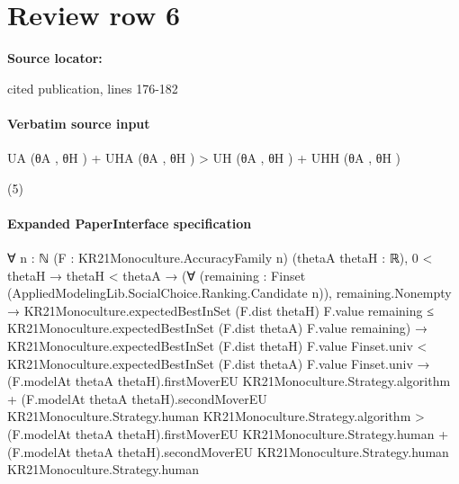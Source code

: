 \documentclass[10pt]{article}
\begin{document}
\section*{Review row 6}
\textbf{Source locator:} {\footnotesize\raggedright cited publication, lines 176-\allowbreak{}182\par}
\paragraph{Verbatim source input}
\begin{ReviewVerbatim}
UA (θA , θH ) + UHA (θA , θH ) > UH (θA , θH ) + UHH (θA , θH )

(5)
\end{ReviewVerbatim}



\paragraph{Expanded PaperInterface specification}
\begin{ReviewVerbatim}
∀ {n : ℕ} (F : KR21Monoculture.AccuracyFamily n) (thetaA thetaH : ℝ),
  0 < thetaH →
    thetaH < thetaA →
      (∀ (remaining : Finset (AppliedModelingLib.SocialChoice.Ranking.Candidate n)),
          remaining.Nonempty →
            KR21Monoculture.expectedBestInSet (F.dist thetaH) F.value remaining ≤
              KR21Monoculture.expectedBestInSet (F.dist thetaA) F.value remaining) →
        KR21Monoculture.expectedBestInSet (F.dist thetaH) F.value Finset.univ <
            KR21Monoculture.expectedBestInSet (F.dist thetaA) F.value Finset.univ →
          (F.modelAt thetaA thetaH).firstMoverEU KR21Monoculture.Strategy.algorithm +
              (F.modelAt thetaA thetaH).secondMoverEU KR21Monoculture.Strategy.human
                KR21Monoculture.Strategy.algorithm >
            (F.modelAt thetaA thetaH).firstMoverEU KR21Monoculture.Strategy.human +
              (F.modelAt thetaA thetaH).secondMoverEU KR21Monoculture.Strategy.human KR21Monoculture.Strategy.human
\end{ReviewVerbatim}
\end{document}
